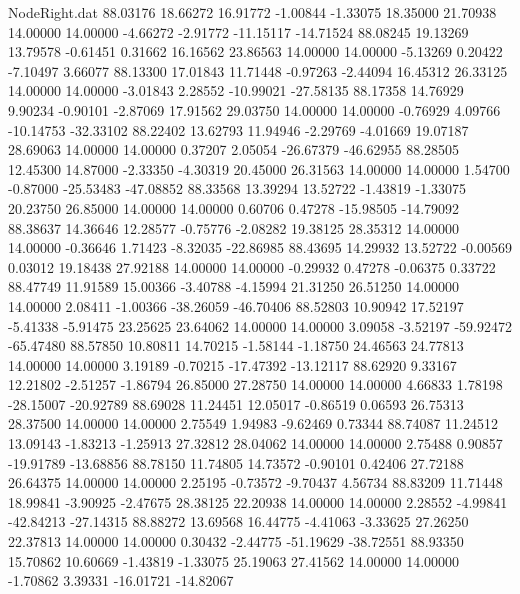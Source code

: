 \begin{filecontents}{NodeRight.dat}
  88.03176   18.66272   16.91772    -1.00844   -1.33075   18.35000   21.70938   14.00000   14.00000   -4.66272   -2.91772  -11.15117  -14.71524
  88.08245   19.13269   13.79578    -0.61451    0.31662   16.16562   23.86563   14.00000   14.00000   -5.13269    0.20422   -7.10497    3.66077
  88.13300   17.01843   11.71448    -0.97263   -2.44094   16.45312   26.33125   14.00000   14.00000   -3.01843    2.28552  -10.99021  -27.58135
  88.17358   14.76929    9.90234    -0.90101   -2.87069   17.91562   29.03750   14.00000   14.00000   -0.76929    4.09766  -10.14753  -32.33102
  88.22402   13.62793   11.94946    -2.29769   -4.01669   19.07187   28.69063   14.00000   14.00000    0.37207    2.05054  -26.67379  -46.62955
  88.28505   12.45300   14.87000    -2.33350   -4.30319   20.45000   26.31563   14.00000   14.00000    1.54700   -0.87000  -25.53483  -47.08852
  88.33568   13.39294   13.52722    -1.43819   -1.33075   20.23750   26.85000   14.00000   14.00000    0.60706    0.47278  -15.98505  -14.79092
  88.38637   14.36646   12.28577    -0.75776   -2.08282   19.38125   28.35312   14.00000   14.00000   -0.36646    1.71423   -8.32035  -22.86985
  88.43695   14.29932   13.52722    -0.00569    0.03012   19.18438   27.92188   14.00000   14.00000   -0.29932    0.47278   -0.06375    0.33722
  88.47749   11.91589   15.00366    -3.40788   -4.15994   21.31250   26.51250   14.00000   14.00000    2.08411   -1.00366  -38.26059  -46.70406
  88.52803   10.90942   17.52197    -5.41338   -5.91475   23.25625   23.64062   14.00000   14.00000    3.09058   -3.52197  -59.92472  -65.47480
  88.57850   10.80811   14.70215    -1.58144   -1.18750   24.46563   24.77813   14.00000   14.00000    3.19189   -0.70215  -17.47392  -13.12117
  88.62920    9.33167   12.21802    -2.51257   -1.86794   26.85000   27.28750   14.00000   14.00000    4.66833    1.78198  -28.15007  -20.92789
  88.69028   11.24451   12.05017    -0.86519    0.06593   26.75313   28.37500   14.00000   14.00000    2.75549    1.94983   -9.62469    0.73344
  88.74087   11.24512   13.09143    -1.83213   -1.25913   27.32812   28.04062   14.00000   14.00000    2.75488    0.90857  -19.91789  -13.68856
  88.78150   11.74805   14.73572    -0.90101    0.42406   27.72188   26.64375   14.00000   14.00000    2.25195   -0.73572   -9.70437    4.56734
  88.83209   11.71448   18.99841    -3.90925   -2.47675   28.38125   22.20938   14.00000   14.00000    2.28552   -4.99841  -42.84213  -27.14315
  88.88272   13.69568   16.44775    -4.41063   -3.33625   27.26250   22.37813   14.00000   14.00000    0.30432   -2.44775  -51.19629  -38.72551
  88.93350   15.70862   10.60669    -1.43819   -1.33075   25.19063   27.41562   14.00000   14.00000   -1.70862    3.39331  -16.01721  -14.82067

\end{filecontents}
